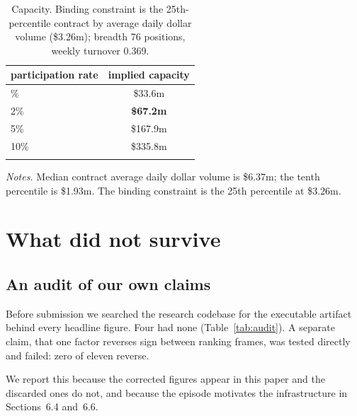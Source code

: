 \documentclass[11pt,letterpaper]{article}
\begin{document}
\begin{table}[!htbp]\centering
\caption{Capacity. Binding constraint is the 25th-percentile contract by average
daily dollar volume (\$3.26m); breadth 76 positions, weekly turnover 0.369.}
\label{tab:cap}
\begin{tabular}{lc}
\toprule
participation rate & implied capacity \\
\midrule\addlinespace[2pt]
1\% & \$33.6m \\
2\% & \textbf{\$67.2m} \\
5\% & \$167.9m \\
10\% & \$335.8m \\
\addlinespace[2pt]
\bottomrule
\end{tabular}

\vspace{4pt}
\begin{minipage}{0.72\textwidth}\footnotesize
\emph{Notes.} Median contract average daily dollar volume is \$6.37m; the tenth
percentile is \$1.93m. The binding constraint is the 25th percentile at \$3.26m.
\end{minipage}
\end{table}

\section{What did not survive}
\label{sec:audit}

\subsection{An audit of our own claims}

Before submission we searched the research codebase for the executable artifact
behind every headline figure. Four had none (Table~\ref{tab:audit}). A separate
claim, that one factor reverses sign between ranking frames, was tested
directly and failed: zero of eleven reverse.

We report this because the corrected figures appear in this paper and the
discarded ones do not, and because the episode motivates the infrastructure in
Sections~6.4 and~6.6.
\end{document}
